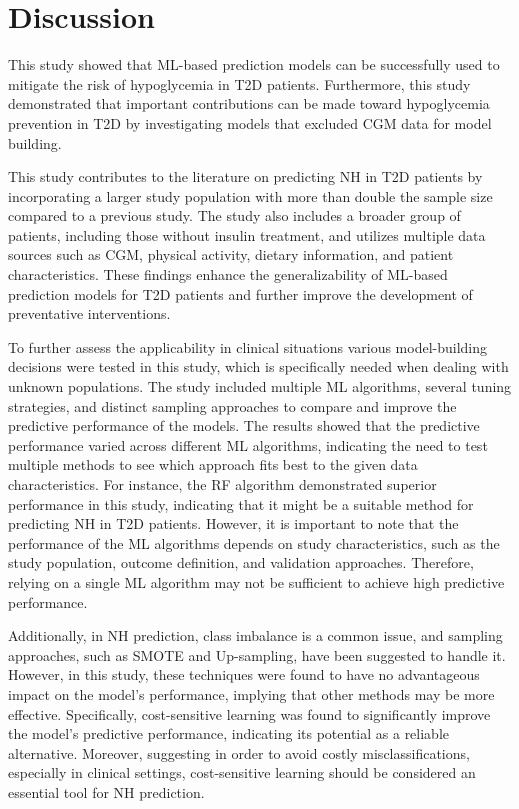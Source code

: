 \section{Discussion}
\label{Discussion}

This study showed that ML-based prediction models can be successfully used to mitigate the risk of hypoglycemia in T2D patients. Furthermore, this study demonstrated that important contributions can be made toward hypoglycemia prevention in T2D by investigating models that excluded CGM data for model building.

This study contributes to the literature on predicting NH in T2D patients by incorporating a larger study population with more than double the sample size compared to a previous study. The study also includes a broader group of patients, including those without insulin treatment, and utilizes multiple data sources such as CGM, physical activity, dietary information, and patient characteristics. These findings enhance the generalizability of ML-based prediction models for T2D patients and further improve the development of preventative interventions.

To further assess the applicability in clinical situations various model-building decisions were tested in this study, which is specifically needed when dealing with unknown populations. The study included multiple ML algorithms, several tuning strategies, and distinct sampling approaches to compare and improve the predictive performance of the models. The results showed that the predictive performance varied across different ML algorithms, indicating the need to test multiple methods to see which approach fits best to the given data characteristics. For instance, the RF algorithm demonstrated superior performance in this study, indicating that it might be a suitable method for predicting NH in T2D patients. However, it is important to note that the performance of the ML algorithms depends on study characteristics, such as the study population, outcome definition, and validation approaches. Therefore, relying on a single ML algorithm may not be sufficient to achieve high predictive performance.

Additionally, in NH prediction, class imbalance is a common issue, and sampling approaches, such as SMOTE and Up-sampling, have been suggested to handle it. However, in this study, these techniques were found to have no advantageous impact on the model's performance, implying that other methods may be more effective. Specifically, cost-sensitive learning was found to significantly improve the model's predictive performance, indicating its potential as a reliable alternative. Moreover, suggesting in order to avoid costly misclassifications, especially in clinical settings, cost-sensitive learning should be considered an essential tool for NH prediction.

